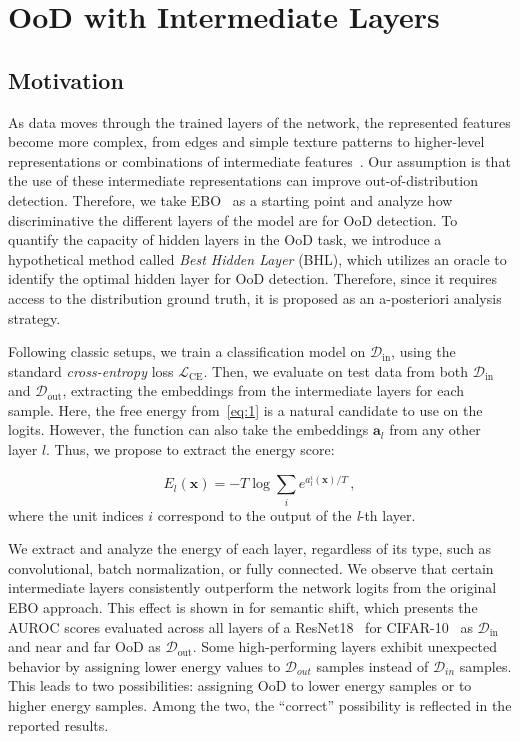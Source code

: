 \documentclass[10pt,twocolumn,a4paper]{article}
\def\rvx{{\mathbf{x}}}
\begin{document}
\section{OoD with Intermediate Layers}\label{sec:method}

\subsection{Motivation}
As data moves through the trained layers of the network, the represented features become more complex, from edges and simple texture patterns to higher-level representations or combinations of intermediate features~\cite{oquab2014learning}. Our assumption is that the use of these intermediate representations can improve out-of-distribution detection. Therefore, we take EBO~\cite{liu2020energy} as a starting point and analyze how discriminative the different layers of the model are for OoD detection. To quantify the capacity of hidden layers in the OoD task, we introduce a hypothetical method called \textit{Best Hidden Layer} (BHL), which utilizes an oracle to identify the optimal hidden layer for OoD detection. Therefore, since it requires access to the distribution ground truth, it is proposed as an a-posteriori analysis strategy.

Following classic setups, we train a classification model on $\mathcal{D}_{\text{in}}$, using the standard \textit{cross-entropy} loss $\mathcal{L}_{\text{CE}}$. Then, we evaluate on test data from both $\mathcal{D}_{\text{in}}$ and $\mathcal{D}_{\text{out}}$, extracting the embeddings from the intermediate layers for each sample.
Here, the free energy from~\cref{eq:1} is a natural candidate to use on the logits. However, the function can also take the embeddings $\mathbf{a}_{l}$ from any other layer $l$. Thus, we propose to extract the energy score:

\begin{equation}\label{eq:2}
    E_{l}(\rvx) = -T \log \sum_{i} e^{a_{l}^{i}(\rvx)/T} \,,
\end{equation}
where the unit indices $i$ correspond to the output of the \mbox{\textit{l}-th} layer. 

We extract and analyze the energy of each layer, regardless of its type, such as convolutional, batch normalization, or fully connected. We observe that certain intermediate layers consistently outperform the network logits from the original EBO approach. This effect is shown in  for semantic shift, which presents the AUROC scores evaluated across all layers of a ResNet18~\cite{he2016deep} for \textsc{CIFAR-10}~\cite{krizhevsky2009learning} as $\mathcal{D}_{\text{in}}$ and near and far OoD as $\mathcal{D}_{\text{out}}$. Some high-performing layers exhibit unexpected behavior by assigning lower energy values to $\mathcal{D}_{out}$ samples instead of $\mathcal{D}_{in}$ samples. This leads to two possibilities: assigning OoD to lower energy samples or to higher energy samples. Among the two, the ``correct'' possibility is reflected in the reported results. 
\end{document}
